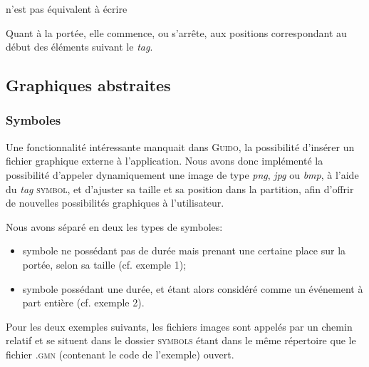 \documentclass{article}
\newenvironment{gmncode}	{\vspace{-2mm}\small\verbatim}{\endverbatim\vspace{-2mm}}
\newcommand{\guido}			{\textsc{Guido}}
\begin{document}
\begin{center}
\begin{gmncode}
[\meter<"4/4">\clef\staffOff a b\staffOn c]
\end{gmncode}
\bigskip

n'est pas équivalent à écrire 
\\
\begin{gmncode}
[\staffOff\meter<"4/4">\clef a b\staffOn c]
\end{gmncode} 
\end{center}

Quant à la portée, elle commence, ou s'arrête, aux positions correspondant au début des éléments suivant le \emph{tag}.


\subsection{Graphiques abstraites}\label{subsec:graphiquesAbstraites}


\subsubsection{Symboles}\label{subsubsec:symboles}

Une fonctionnalité intéressante manquait dans \guido, la possibilité d'insérer un fichier graphique externe à l'application. Nous avons donc implémenté la possibilité d'appeler dynamiquement une image de type \emph{png}, \emph{jpg} ou \emph{bmp}, à l'aide du \emph{tag} \textsc{symbol}, et d'ajuster sa taille et sa position dans la partition, afin d'offrir de nouvelles possibilités graphiques à l'utilisateur.

Nous avons séparé en deux les types de symboles:
\begin{itemize}
	\item symbole ne possédant pas de durée mais prenant une certaine place sur la portée, selon sa taille (cf. exemple 1);
	\item symbole possédant une durée, et étant alors considéré comme un événement à part entière (cf. exemple 2).
\end{itemize}

Pour les deux exemples suivants, les fichiers images sont appelés par un chemin relatif et se situent dans le dossier \textsc{symbols} étant dans le même répertoire que le fichier \textsc{.gmn} (contenant le code de l'exemple) ouvert.
\end{document}
